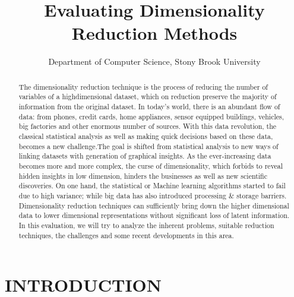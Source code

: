 \documentclass[letterpaper, 10 pt, conference]{ieeeconf}  %
\title{\LARGE \bf
Evaluating Dimensionality Reduction Methods
}
\author{Department of Computer Science, Stony Brook University}%
\begin{document}
\maketitle
\thispagestyle{empty}
\pagestyle{empty}


\begin{abstract}

The dimensionality reduction technique is the process of reducing the number of variables of a highdimensional
dataset, which on reduction preserve the majority of information from the original dataset. In
today’s world, there is an abundant flow of data: from phones, credit cards, home appliances, sensor
equipped buildings, vehicles, big factories and other enormous number of sources. With this data revolution,
the classical statistical analysis as well as making quick decisions based on these data, becomes a new
challenge.The goal is shifted from statistical analysis to new ways of linking datasets with generation of graphical
insights. As the ever-increasing data becomes more and more complex, the curse of dimensionality, which
forbids to reveal hidden insights in low dimension, hinders the businesses as well as new scientific
discoveries. On one hand, the statistical or Machine learning algorithms started to fail due to high variance;
while big data has also introduced processing \& storage barriers. Dimensionality reduction techniques can
sufficiently bring down the higher dimensional data to lower dimensional representations without significant
loss of latent information. In this evaluation, we will try to analyze the inherent problems, suitable reduction
techniques, the challenges and some recent developments in this area.

\end{abstract}
\section{INTRODUCTION}
\end{document}
